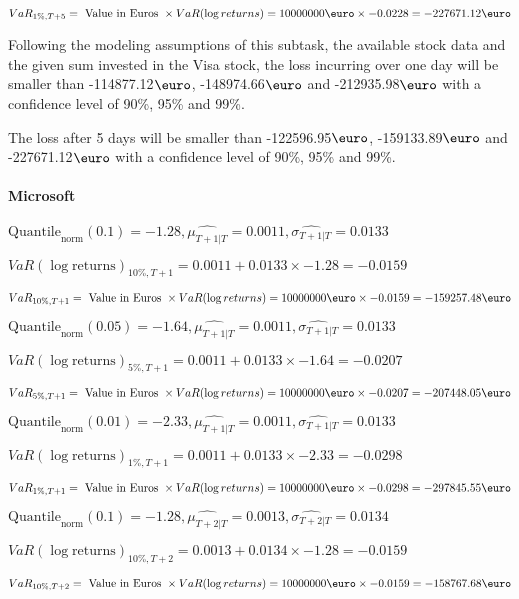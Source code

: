 $VaR_{1\%, T + 5} = \text{ Value in Euros } \times VaR(\log returns) = 10 000 000 \text{\euro} \times-0.0228 = -227671.12 \text{\euro}$


Following the modeling assumptions of this subtask, the available stock data and the given sum invested in the Visa stock, the loss incurring over one day will be smaller than -114877.12$\text{\euro}$, -148974.66$\text{\euro}$  and -212935.98$\text{\euro}$  with a confidence level of 90\%, 95\%  and 99\%.

The loss after 5 days will be smaller than -122596.95$\text{\euro}$, -159133.89$\text{\euro}$  and -227671.12$\text{\euro}$  with a confidence level of 90\%, 95\%  and 99\%.


\paragraph{Microsoft}


$\text{Quantile}_\text{norm}(0.1) = -1.28,\hat{\mu_{T+1|T}} = 0.0011, \hat{\sigma_{T+1|T}} = 0.0133$

$VaR(\log \text{returns})_{10\%, T + 1} = 0.0011 + 0.0133\times-1.28 = -0.0159$

$VaR_{10\%, T + 1} = \text{ Value in Euros } \times VaR(\log returns) = 10 000 000 \text{\euro} \times-0.0159 = -159257.48 \text{\euro}$


$\text{Quantile}_\text{norm}(0.05) = -1.64,\hat{\mu_{T+1|T}} = 0.0011, \hat{\sigma_{T+1|T}} = 0.0133$

$VaR(\log \text{returns})_{5\%, T + 1} = 0.0011 + 0.0133\times-1.64 = -0.0207$

$VaR_{5\%, T + 1} = \text{ Value in Euros } \times VaR(\log returns) = 10 000 000 \text{\euro} \times-0.0207 = -207448.05 \text{\euro}$


$\text{Quantile}_\text{norm}(0.01) = -2.33,\hat{\mu_{T+1|T}} = 0.0011, \hat{\sigma_{T+1|T}} = 0.0133$

$VaR(\log \text{returns})_{1\%, T + 1} = 0.0011 + 0.0133\times-2.33 = -0.0298$

$VaR_{1\%, T + 1} = \text{ Value in Euros } \times VaR(\log returns) = 10 000 000 \text{\euro} \times-0.0298 = -297845.55 \text{\euro}$


$\text{Quantile}_\text{norm}(0.1) = -1.28,\hat{\mu_{T+2|T}} = 0.0013, \hat{\sigma_{T+2|T}} = 0.0134$

$VaR(\log \text{returns})_{10\%, T + 2} = 0.0013 + 0.0134\times-1.28 = -0.0159$

$VaR_{10\%, T + 2} = \text{ Value in Euros } \times VaR(\log returns) = 10 000 000 \text{\euro} \times-0.0159 = -158767.68 \text{\euro}$


